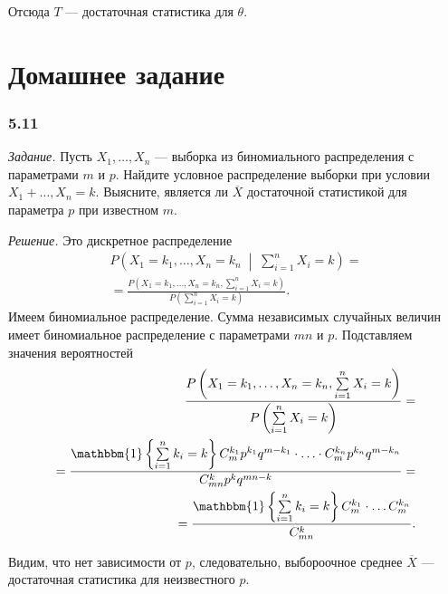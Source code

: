 Отсюда $T$ --- достаточная статистика для $ \theta $.

\section*{Домашнее задание}

\subsubsection*{5.11}

\textit{Задание.}
Пусть $X_1, \dotsc, X_n$ --- выборка из биномиального распределения с параметрами $m$ и $p$.
Найдите условное распределение выборки при условии $X_1 + \dotsc, X_n = k$.
Выясните, является ли $ \overline{X}$ достаточной статистикой для параметра $p$ при известном $m$.

\textit{Решение.} Это дискретное распределение
\begin{equation*}
  \begin{split}
    P \left( X_1 = k_1, \dotsc, X_n = k_n \; \middle| \; \sum \limits_{i = 1}^n X_i = k \right) = \\
    = \frac{P \left( X_1 = k_1, \dotsc, X_n = k_n, \sum \limits_{i = 1}^n X_i = k \right) }{P \left( \sum \limits_{i = 1}^n X_i = k \right) }.
  \end{split}
\end{equation*}
Имеем биномиальное распределение.
Сумма независимых случайных величин имеет биномиальное распределение с параметрами $mn$ и $p$.
Подставляем значения вероятностей
\begin{equation*}
  \begin{split}
    \frac{P \left( X_1 = k_1, \dotsc, X_n = k_n, \sum \limits_{i = 1}^n X_i = k \right) }{P \left( \sum \limits_{i = 1}^n X_i = k \right) } = \\
    = \frac{ \mathbbm{1} \left\{ \sum \limits_{i = 1}^n k_i = k \right\} C_m^{k_1} p^{k_1} q^{m - k_1} \cdot \dotsc \cdot C_m^{k_n} p^{k_n} q^{m - k_n}}{C_{mn}^k p^k q^{mn-k}} = \\
    = \frac{ \mathbbm{1} \left\{ \sum \limits_{i = 1}^n k_i = k \right\} C_m^{k_1} \cdot \dotsc C_m^{k_n}}{C_{mn}^k}.
  \end{split}
\end{equation*}

Видим, что нет зависимости от $p$, следовательно, выбороочное среднее $ \overline{X}$ ---
достаточная статистика для неизвестного $p$.

